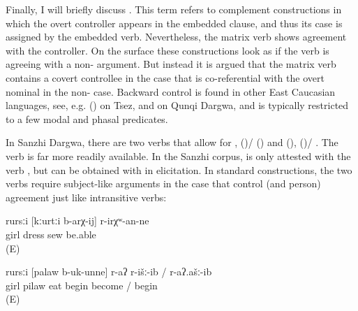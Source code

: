 Finally, I will briefly discuss . This term refers to complement constructions in which the overt controller appears in the embedded clause, and thus its case is assigned by the embedded verb. Nevertheless, the matrix verb shows agreement with the controller. On the surface these constructions look as if the verb is agreeing with a non- argument. But instead it is argued that the matrix verb contains a covert controllee in the  case that is co-referential with the overt nominal in the non- case. Backward control is found in other East Caucasian languages, see, e.g.  () on Tsez, and \citet{Serdobolskaya2010} on Qunqi Dargwa, and is typically restricted to a few modal and phasal predicates.

In Sanzhi Dargwa, there are two verbs that allow for ,  ()\slash{} ()  and  (),  ()\slash{} . The verb  is far more readily available. In the Sanzhi corpus,  is only attested with the verb , but can be obtained with  in elicitation. In standard  constructions, the two verbs require subject-like arguments in the  case that control  (and person) agreement just like intransitive verbs:
%
\begin{exe}
	\ex
	\gll	rursːi	[kːurtːi	b-arχ-ij]	r-irχʷ-an-ne\\
		girl	dress	sew	be.able\\
	\glt	{} (E)

	\ex
	\gll	rursːi	[palaw	b-uk-unne]	r-aʔ	r-išː-ib	/	r-aʔ.ašː-ib\\
		girl	pilaw	eat \tsc{f-}begin	become	/ begin\\
	\glt	{} (E)
\end{exe}

